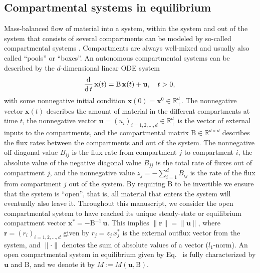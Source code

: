 \documentclass[smallextended]{svjour3}
\makeatletter
\renewcommand*{\eqref}[1]{%
  \hyperref[{#1}]{\textup{\tagform@{\ref*{#1}}}}%
}
\renewcommand{\tens}[1]{\mathrm{#1}}
\renewcommand{\vec}[1]{\mathbf{#1}}
\newcommand{\R}{\mathbb{R}}
\newcommand{\deriv}[1]{\frac{\operatorname{d}}{\operatorname{d}#1}}
\newcommand{\vnorms}[1]{\|#1\|}
\newcommand{\ie}{that is}
\renewcommand{\emph}[1]{``#1''}
\makeatother
\begin{document}
\subsection{Compartmental systems in equilibrium}\label{sec:one_particle}
Mass-balanced flow of material into a system, within the system and out of the system that consists of several compartments can be modeled by so-called compartmental systems \citep{Anderson1983, Jacquez1993SIAM}.
Compartments are always well-mixed and usually also called \emph{pools} or \emph{boxes}.
An autonomous compartmental systems can be described by the $d$-dimensional linear ODE system
\begin{equation}\label{eqn:lin_CS_sys}
  \deriv{t}\,\vec{x}(t) = \tens{B}\,\vec{x}(t) + \vec{u},\quad t>0,\\
\end{equation}
with some nonnegative initial condition $\vec{x}(0) = \vec{x}^0\in\R^d_+$.
The nonnegative vector $\vec{x}(t)$ describes the amount of material in the different compartments at time $t$, the nonnegative vector $\vec{u}=(u_i)_{i=1,2,\ldots,d} \in\R^d_+$ is the vector of external inputs to the compartments, and the compartmental matrix $\tens{B}\in\R^{d\times d}$ describes the flux rates between the compartments and out of the system.
The nonnegative off-diagonal value $B_{ij}$ is the flux rate from compartment $j$ to compartment $i$, the absolute value of the negative diagonal value $B_{jj}$ is the total rate of fluxes out of compartment $j$, and the nonnegative value $z_j=-\sum_{i=1}^d B_{ij}$ is the rate of the flux from compartment $j$ out of the system.
By requiring $\tens{B}$ to be invertible we ensure that the system is \emph{open}, \ie, all material that enters the system will eventually also leave it.
Throughout this manuscript, we consider the open compartmental system \eqref{eqn:lin_CS_sys} to have reached its unique steady-state or equilibrium compartment vector $\vec{x}^\ast = -\tens{B}^{-1}\,\vec{u}$.
This implies $\vnorms{\vec{r}} = \vnorms{\vec{u}}$, where $\vec{r} = (r_i)_{i=1,2,\ldots,d}$ given by $r_j=z_j\,x^\ast_j$ is the external outflux vector from the system, and $\vnorms{\cdot}$ denotes the sum of absolute values of a vector ($l_1$-norm). 
An open compartmental system in equilibrium given by Eq.~\eqref{eqn:lin_CS_sys} is fully characterized by $\vec{u}$ and $\tens{B}$, and we denote it by $M:=M(\vec{u},\tens{B})$.
\end{document}
